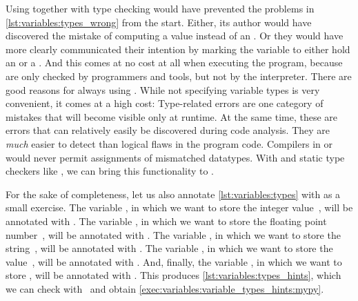 Using  together with type checking would have prevented the problems in \cref{lst:variables:types_wrong} from the start.
Either, its author would have discovered the mistake of computing a  value instead of an .
Or they would have more clearly communicated their intention by marking the variable to either hold an  or a .
And this comes at no cost at all when executing the program, because  are only checked by programmers and tools, but not by the interpreter.%
%
%
%
There are good reasons for always using .
While not specifying variable types is very convenient, it comes at a high cost:%
%
%
%
Type-related errors are one category of mistakes that will become visible only at runtime.
At the same time, these are errors that can relatively easily be discovered during code analysis.
They are \emph{much} easier to detect than logical flaws in the program code.
Compilers in  or  would never permit assignments of mismatched datatypes.
With  and static type checkers like \mypy, we can bring this functionality to \python.%
%
%
%

For the sake of completeness, let us also annotate \cref{lst:variables:types} with  as a small exercise.
The variable , in which we want to store the integer value~, will be annotated with .
The variable , in which we want to store the floating point number~, will be annotated with .
The variable , in which we want to store the string~, will be annotated with .
The variable , in which we want to store the value~, will be annotated with .
And, finally, the variable , in which we want to store , will be annotated with .
This produces \cref{lst:variables:types_hints}, which we can check with \mypy\ and obtain \cref{exec:variables:variable_types_hints:mypy}.

